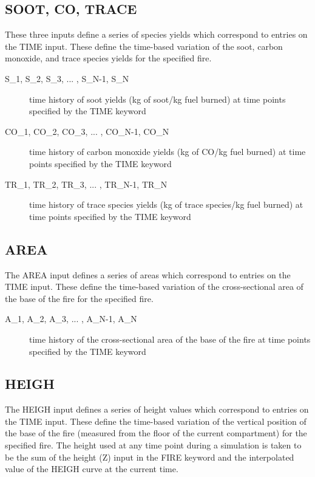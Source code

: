 \subsection{SOOT, CO, TRACE}

These three inputs define a series of species yields which correspond to entries on the TIME input.  These define the time-based variation of the soot, carbon monoxide, and trace species yields for the specified fire.

\begin{adjustwidth}{1cm}{0cm}
\begin{description}
  \item[S\_1, S\_2, S\_3, ... , S\_N-1, S\_N] time history of soot yields (kg of soot/kg fuel burned) at time points specified by the TIME keyword
  \item[CO\_1, CO\_2, CO\_3, ... , CO\_N-1, CO\_N] time history of carbon monoxide yields (kg of CO/kg fuel burned) at time points specified by the TIME keyword
  \item[TR\_1, TR\_2, TR\_3, ... , TR\_N-1, TR\_N] time history of trace species yields (kg of trace species/kg fuel burned) at time points specified by the TIME keyword
\end{description}
\end{adjustwidth}

\subsection{AREA}

The AREA input defines a series of areas which correspond to entries on the TIME input.  These define the time-based variation of the cross-sectional area of the base of the fire for the specified fire.

\begin{adjustwidth}{1cm}{0cm}
\begin{description}
  \item[A\_1, A\_2, A\_3, ... , A\_N-1, A\_N] time history of the cross-sectional area of the base of the fire at time points specified by the TIME keyword
\end{description}
\end{adjustwidth}

\subsection{HEIGH}

The HEIGH input defines a series of height values which correspond to entries on the TIME input.  These define the time-based variation of the vertical position of the base of the fire (measured from the floor of the current compartment) for the specified fire. The height used at any time point during a simulation is taken to be the sum of the height (Z) input in the FIRE keyword and the interpolated value of the HEIGH curve at the current time.

